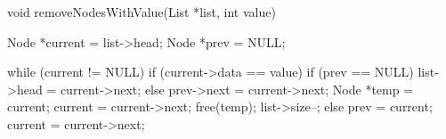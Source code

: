 \begin{codebox}[lang=c, fontsize=\small]
void removeNodesWithValue(List *list, int value) {
    Node *current = list->head;
    Node *prev = NULL;

    while (current != NULL) {
        if (current->data == value) {
            if (prev == NULL) {
                list->head = current->next;
            } else {
                prev->next = current->next;
            }
            Node *temp = current;
            current = current->next;
            free(temp);
            list->size--;
        } else {
            prev = current;
            current = current->next;
        }
    }
}
\end{codebox}
